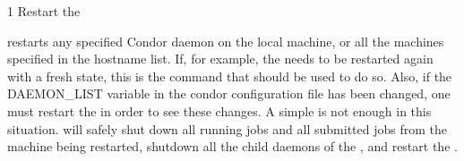 \begin{ManPage}{\label{man-condor-restart}}{1}
{Restart the }
\Synopsis {}
\ToolArgs


\Description 

 restarts any specified Condor daemon on the local
machine, or all the machines specified in the hostname list.  If, for
example, the  needs to be restarted again with
a fresh state, this is the command that should be used to do so.
Also, if the DAEMON\_LIST variable in the condor configuration file has
been changed, one must restart the  in order to see these
changes.  A simple  is not enough in this situation.
 will safely shut down all running jobs and all submitted
jobs from the machine being restarted, shutdown all the child daemons
of the , and restart the .

\begin{Options}
	\ToolArgsDesc
\end{Options}

\end{ManPage}
